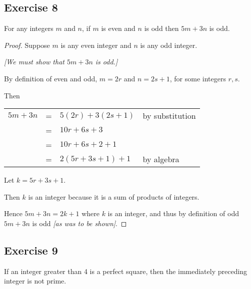 \documentclass[14pt]{extarticle}
\begin{document}
\subsection{Exercise 8}
For any integers $m$ and $n$, if $m$ is even and $n$ is odd
then $5m + 3n$ is odd.

\begin{proof}
Suppose $m$ is any even integer and $n$ is any odd integer.  

{\it [We must show that $5m+3n$ is odd.]}

By definition of even and odd, $m = 2r$ and $n = 2s+1$, for some integers $r, s$. 

Then

\begin{center}
\begin{tabular}{rcll}
$5m+3n$ & = & $5(2r)+3(2s+1)$ & \color{cyan} by substitution \\
& = & $10r+6s+3$ & \\
& = & $10r+6s+2+1$ & \\
& = & $2(5r+3s+1)+1$ & \color{cyan} by algebra \\
\end{tabular}
\end{center}

Let $k = 5r+3s+1$. 

Then $k$ is an integer because it is a sum of products of integers. 

Hence $5m+3n = 2k+1$ where $k$ is an integer, and thus by definition of odd $5m+3n$ is odd {\it [as was to be shown]}.
\end{proof}

\subsection{Exercise 9}
If an integer greater than 4 is a perfect square, then the immediately preceding integer is not prime.
\end{document}
